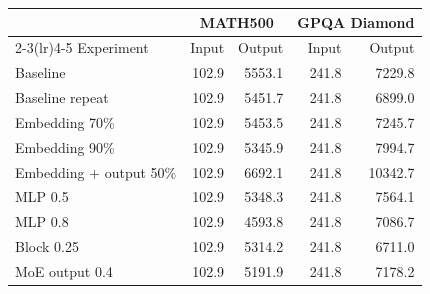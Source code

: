 \begin{tabular}{lrrrr}
\toprule
& \multicolumn{2}{c}{MATH500} & \multicolumn{2}{c}{GPQA Diamond} \\
\cmidrule(lr){2-3}\cmidrule(lr){4-5}
Experiment & Input & Output & Input & Output \\
\midrule
Baseline & 102.9 & 5553.1 & 241.8 & 7229.8 \\
Baseline repeat & 102.9 & 5451.7 & 241.8 & 6899.0 \\
Embedding 70\% & 102.9 & 5453.5 & 241.8 & 7245.7 \\
Embedding 90\% & 102.9 & 5345.9 & 241.8 & 7994.7 \\
Embedding + output 50\% & 102.9 & 6692.1 & 241.8 & 10342.7 \\
MLP 0.5 & 102.9 & 5348.3 & 241.8 & 7564.1 \\
MLP 0.8 & 102.9 & 4593.8 & 241.8 & 7086.7 \\
Block 0.25 & 102.9 & 5314.2 & 241.8 & 6711.0 \\
MoE output 0.4 & 102.9 & 5191.9 & 241.8 & 7178.2 \\
\bottomrule
\end{tabular}
